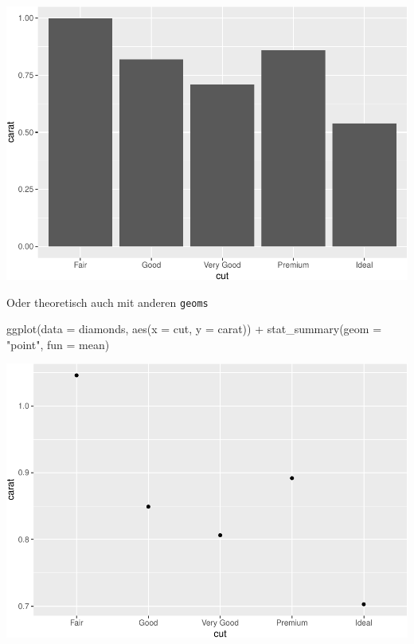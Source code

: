 \documentclass[
]{book}
\newenvironment{Shaded}{\begin{snugshade}}{\end{snugshade}}
\newcommand{\AttributeTok}[1]{\textcolor[rgb]{0.77,0.63,0.00}{#1}}
\newcommand{\FunctionTok}[1]{\textcolor[rgb]{0.00,0.00,0.00}{#1}}
\newcommand{\NormalTok}[1]{#1}
\newcommand{\SpecialCharTok}[1]{\textcolor[rgb]{0.00,0.00,0.00}{#1}}
\newcommand{\StringTok}[1]{\textcolor[rgb]{0.31,0.60,0.02}{#1}}
\begin{document}
\includegraphics{CFH_R_bookdown_files/figure-latex/unnamed-chunk-165-1.pdf}

Oder theoretisch auch mit anderen \texttt{geoms}

\begin{Shaded}
\begin{Highlighting}[]
\FunctionTok{ggplot}\NormalTok{(}\AttributeTok{data =}\NormalTok{ diamonds, }\FunctionTok{aes}\NormalTok{(}\AttributeTok{x =}\NormalTok{ cut, }\AttributeTok{y =}\NormalTok{ carat)) }\SpecialCharTok{+}
  \FunctionTok{stat\_summary}\NormalTok{(}\AttributeTok{geom =} \StringTok{"point"}\NormalTok{, }\AttributeTok{fun =}\NormalTok{ mean) }
\end{Highlighting}
\end{Shaded}

\includegraphics{CFH_R_bookdown_files/figure-latex/unnamed-chunk-166-1.pdf}
\end{document}
